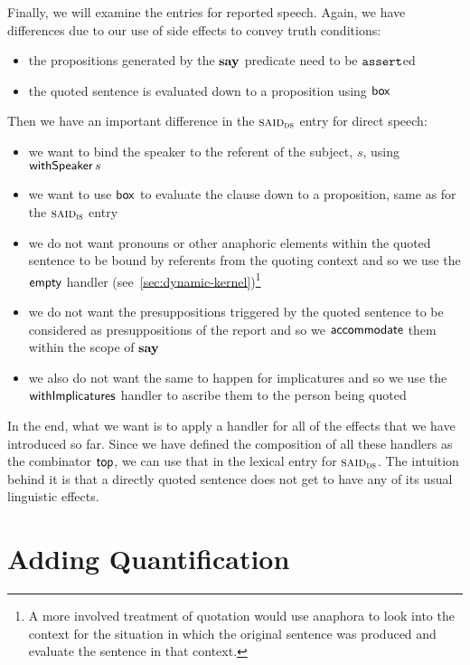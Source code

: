 Finally, we will examine the entries for reported speech. Again, we have
differences due to our use of side effects to convey truth conditions:

\begin{itemize}
\item the propositions generated by the $\textbf{say}$ predicate need to be
  $\mathtt{assert}$ed
\item the quoted sentence is evaluated down to a proposition using $\mathsf{box}$
\end{itemize}

Then we have an important difference in the $\textsc{said}_{\textsc{ds}}$ entry
for direct speech:

\begin{itemize}
\item we want to bind the speaker to the referent of the subject, $s$,
  using $\mathsf{withSpeaker}\,s$
\item we want to use $\mathsf{box}$ to evaluate the clause down to a proposition,
  same as for the $\textsc{said}_{\textsc{is}}$ entry
\item we do not want pronouns or other anaphoric elements within the quoted
  sentence to be bound by referents from the quoting context and so we use
  the $\mathsf{empty}$ handler (see~\ref{sec:dynamic-kernel})\footnote{A more
    involved treatment of quotation would use anaphora to look into the
    context for the situation in which the original sentence was produced
    and evaluate the sentence in that context.}
\item we do not want the presuppositions triggered by the quoted sentence
  to be considered as presuppositions of the report and so we
  $\mathsf{accommodate}$ them within the scope of $\textbf{say}$
\item we also do not want the same to happen for implicatures and so we use
  the $\mathsf{withImplicatures}$ handler to ascribe them to the person being
  quoted
\end{itemize}

In the end, what we want is to apply a handler for all of the effects that
we have introduced so far. Since we have defined the composition of all
these handlers as the combinator $\mathsf{top}$, we can use that in the lexical
entry for $\textsc{said}_{\textsc{ds}}$. The intuition behind it is that a
directly quoted sentence does not get to have any of its usual linguistic
effects.


\section{Adding Quantification}
\label{sec:adding-quantification}

